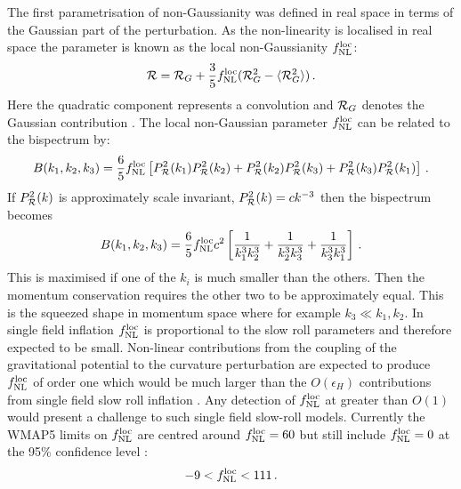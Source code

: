 The first parametrisation of non-Gaussianity was defined in
real space in terms of the Gaussian part of the perturbation. As the
non-linearity is localised in real space the parameter is
known as the local non-Gaussianity $f_{\mathrm{NL}}^\mathrm{loc}$: 
% 
\begin{equation} 
{\cal{R}} = {\cal{R}}_G + \frac{3}{5} f_{\mathrm{NL}}^\mathrm{loc}  (
{\cal{R}}_G^2 -\langle {\cal{R}}_G^2 \rangle )\,.
\end{equation}
Here the 
quadratic component represents a convolution and 
$\mathcal{R}_G$ denotes the Gaussian contribution \cite{maldacena}\footnotemark.
The local non-Gaussian parameter $f_{\mathrm{NL}}^\mathrm{loc}$ can be related to the bispectrum by:
\begin{equation}
 B(k_1, k_2, k_3) = \frac{6}{5}f_{\mathrm{NL}}^\mathrm{loc} \left[P_{\mathcal{R}}^2(k_1)P_{\mathcal{R}}^2(k_2) +
P_{\mathcal{R}}^2(k_2)P_{\mathcal{R}}^2(k_3) + P_{\mathcal{R}}^2(k_3)P_{\mathcal{R}}^2(k_1)\right]\,.
\end{equation}
% 
If $P_{\mathcal{R}}^2(k)$ is approximately scale invariant, $P_{\mathcal{R}}^2(k) = c k^{-3}$ then
the bispectrum becomes \cite{Baumann2009}
% 
\begin{equation}
 B(k_1, k_2, k_3) = \frac{6}{5}f_{\mathrm{NL}}^\mathrm{loc} c^2\left[\frac{1}{k_1^3 k_2^3} +
\frac{1}{k_2^3 k_3^3} + \frac{1}{k_3^3 k_1^3}\right]\,.
\end{equation}
% 
This is maximised if one of the $k_i$ is much smaller than the others. Then the
momentum conservation requires the other two to be approximately equal. This is
the squeezed shape in momentum space where for example $k_3 \ll k_1,k_2$. In
single field inflation $f_{\mathrm{NL}}^\mathrm{loc}$ is proportional to the slow roll parameters
and therefore expected to be small. Non-linear contributions from the coupling
of the gravitational potential to the curvature perturbation are expected to
produce $f_{\mathrm{NL}}^\mathrm{loc}$ of order one which would be much larger than the
$O(\epsilon_H)$ contributions from single field slow roll inflation
\cite{Bartolo:2004if, Komatsu:2008hk}. Any detection of $f_{\mathrm{NL}}^\mathrm{loc}$ at greater
than $O(1)$ would present a challenge to such single field slow-roll models. 
Currently the WMAP5 limits on $f_{\mathrm{NL}}^\mathrm{loc}$ are centred around $f_{\mathrm{NL}}^\mathrm{loc}=60$ but
still include $f_{\mathrm{NL}}^\mathrm{loc}=0$ at the 95\% confidence level \cite{Komatsu:2008hk}:
\begin{equation}
 -9<f_{\mathrm{NL}}^\mathrm{loc}<111\,.
\end{equation}


